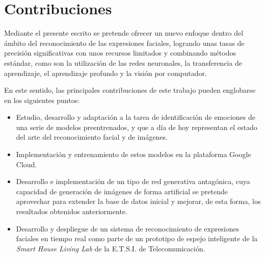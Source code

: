 \section{Contribuciones}

Mediante el presente escrito se pretende ofrecer un nuevo enfoque dentro del ámbito del reconocimiento de las expresiones faciales, logrando unas tasas de precisión significativas con unos recursos limitados y combinando métodos estándar, como son la utilización de las redes neuronales, la transferencia de aprendizaje, el aprendizaje profundo y la visión por computador.
 
En este sentido, las principales contribuciones de este trabajo pueden englobarse en los siguientes puntos:
\begin{itemize}
  \item Estudio, desarrollo y adaptación a la tarea de identificación de emociones de una serie de modelos preentrenados, y que a día de hoy representan el estado del arte del reconocimiento facial y de imágenes.
  \item Implementación y entrenamiento de estos modelos en la plataforma Google Cloud.
  \item Desarrollo e implementación de un tipo de red generativa antagónica, cuya capacidad de generación de imágenes de forma artificial se pretende aprovechar para extender la base de datos inicial y mejorar, de esta forma, los resultados obtenidos anteriormente.
  \item Desarrollo y despliegue de un sistema de reconocimiento de expresiones faciales en tiempo real como parte de un prototipo de espejo inteligente de la \textit{Smart House Living Lab} de la E.T.S.I. de Telecomunicación.
\end{itemize}